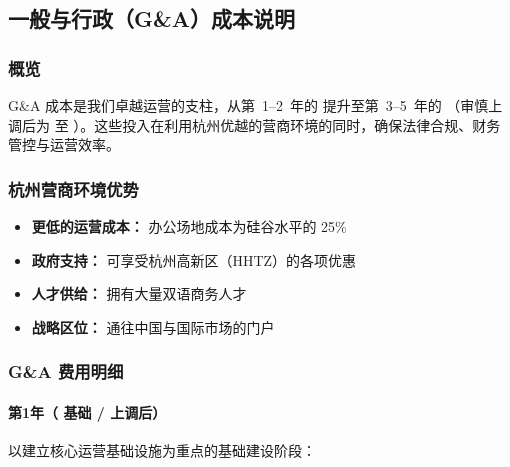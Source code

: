\documentclass[11pt, a4paper, oneside]{article}
\begin{document}
\subsection{一般与行政（G\&A）成本说明}

\subsubsection{概览}
G\&A 成本是我们卓越运营的支柱，从第~1--2~年的  提升至第~3--5~年的 （审慎上调后为  至 ）。这些投入在利用杭州优越的营商环境的同时，确保法律合规、财务管控与运营效率。

\subsubsection{杭州营商环境优势}
\begin{itemize}
    \item \textbf{更低的运营成本：} 办公场地成本为硅谷水平的 25\%
    \item \textbf{政府支持：} 可享受杭州高新区（HHTZ）的各项优惠
    \item \textbf{人才供给：} 拥有大量双语商务人才
    \item \textbf{战略区位：} 通往中国与国际市场的门户
\end{itemize}

\subsubsection{G\&A 费用明细}

\paragraph{第1年（ 基础 /  上调后）}
以建立核心运营基础设施为重点的基础建设阶段：
\end{document}
